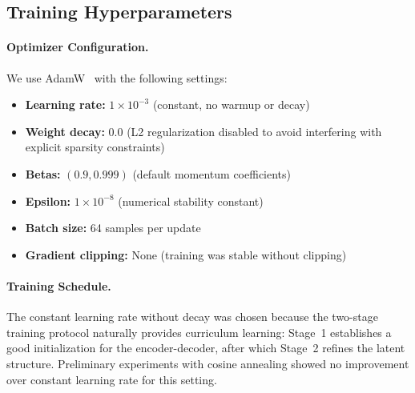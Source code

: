 \subsection{Training Hyperparameters}

\paragraph{Optimizer Configuration.} We use AdamW~\citep{loshchilov2019decoupledweightdecayregularization} with the following settings:
\begin{itemize}[leftmargin=*,noitemsep]
    \item \textbf{Learning rate:} $1 \times 10^{-3}$ (constant, no warmup or decay)
    \item \textbf{Weight decay:} $0.0$ (L2 regularization disabled to avoid interfering with explicit sparsity constraints)
    \item \textbf{Betas:} $(0.9, 0.999)$ (default momentum coefficients)
    \item \textbf{Epsilon:} $1 \times 10^{-8}$ (numerical stability constant)
    \item \textbf{Batch size:} 64 samples per update
    \item \textbf{Gradient clipping:} None (training was stable without clipping)
\end{itemize}

\paragraph{Training Schedule.} The constant learning rate without decay was chosen because the two-stage training protocol naturally provides curriculum learning: Stage~1 establishes a good initialization for the encoder-decoder, after which Stage~2 refines the latent structure. Preliminary experiments with cosine annealing showed no improvement over constant learning rate for this setting.
